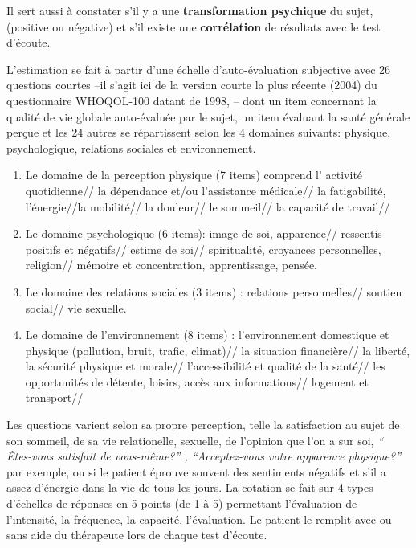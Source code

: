 Il sert aussi à constater s'il y a une\textbf{ transformation psychique }du sujet,
 (positive ou négative) et s'il existe une \textbf{corrélation }de
 résultats avec le test d'écoute.

 
        L'estimation se fait à partir d'une échelle
d'auto-évaluation subjective avec 26 questions courtes 
--il s'agit ici de la version courte  la plus récente (2004) du questionnaire
 WHOQOL-100 datant de 1998, --
dont un item concernant la qualité de vie globale
auto-évaluée par le sujet, un item évaluant la santé générale perçue
et les 24 autres se répartissent selon les 4 domaines suivants: physique, psychologique, relations sociales et environnement.
\begin{enumerate}
\item  Le domaine de la perception physique (7 items) comprend l' activité quotidienne// la dépendance et/ou l'assistance médicale// la fatigabilité, l'énergie//la mobilité// la douleur// le sommeil// la capacité de travail//
	\item Le domaine psychologique (6 items):  image de soi, apparence// ressentis positifs et négatifs// estime de soi// spiritualité, croyances personnelles, religion// mémoire et concentration, apprentissage, pensée.
		\item Le domaine des relations sociales (3 items) : relations personnelles// soutien social// vie sexuelle.
			\item Le domaine de l'environnement (8 items) :
                         l'environnement domestique et physique
                         (pollution, bruit, trafic, climat)// la
                         situation financière//  la liberté, la
                         sécurité physique et morale//
                         l'accessibilité et qualité de la santé// les
                         opportunités de détente, loisirs, accès aux
                         informations// logement et transport// 
\end{enumerate}
		Les questions varient selon sa propre perception, telle la satisfaction
au sujet de son  sommeil, de sa vie relationelle, sexuelle, de
l'opinion que l'on a sur soi, \textit{`` Êtes-vous satisfait de
vous-même?'' , ``Acceptez-vous votre apparence physique?''} par
exemple, ou si le patient éprouve souvent des sentiments négatifs
et s'il a assez d'énergie dans la vie de tous les jours.
La cotation se fait sur 4 types d'échelles de réponses en 5 points (de 1 à 5)
permettant l'évaluation de l'intensité, la fréquence, la capacité, l'évaluation.
Le patient le remplit avec ou sans aide du
thérapeute lors de chaque test
d'écoute.

